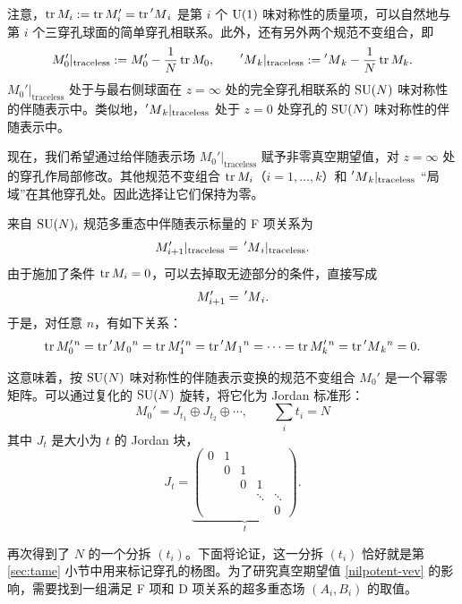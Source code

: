 注意，$\mathop{\mathrm{tr}}\nolimits M_i:=\mathop{\mathrm{tr}}\nolimits M_i'=\mathop{\mathrm{tr}}\nolimits\prescript{\prime}{}M_i$ 是第 $i$ 个 ${\mathrm{U}}(1)$ 味对称性的质量项，可以自然地与第 $i$ 个三穿孔球面的简单穿孔相联系。此外，还有另外两个规范不变组合，即
\begin{equation}
M_0'|_\text{traceless}:=M_0'-\frac1N\mathop{\mathrm{tr}}\nolimits M_0,\qquad
\prescript{\prime}{}M_k|_\text{traceless}:=\prescript{\prime}{}M_k-\frac1N\mathop{\mathrm{tr}}\nolimits M_k.
\end{equation}
$M_0'|_\text{traceless}$ 处于与最右侧球面在 $z=\infty$ 处的完全穿孔相联系的 $\mathop{\mathrm{SU}}(N)$ 味对称性的伴随表示中。类似地，$\prescript{\prime}{}M_k|_\text{traceless}$ 处于 $z=0$ 处穿孔的 $\mathop{\mathrm{SU}}(N)$ 味对称性的伴随表示中。

现在，我们希望通过给伴随表示场 $M_0'|_\text{traceless}$ 赋予非零真空期望值，对 $z=\infty$ 处的穿孔作局部修改。其他规范不变组合 $\mathop{\mathrm{tr}}\nolimits M_i$（$i=1,\ldots,k$）和 $\prescript{\prime}{}M_k|_\text{traceless}$ “局域”在其他穿孔处。因此选择让它们保持为零。

来自 $\mathop{\mathrm{SU}}(N)_i$ 规范多重态中伴随表示标量的 F 项关系为
\begin{equation}
M_{i+1}'|_\text{traceless}={}\prescript{\prime}{}M_i|_\text{traceless}.
\end{equation}
由于施加了条件 $\mathop{\mathrm{tr}}\nolimits M_i=0$，可以去掉取无迹部分的条件，直接写成
\begin{equation}
M_{i+1}'={}\prescript{\prime}{}M_i.
\end{equation}
于是，对任意 $n$，有如下关系：
\begin{equation}
\mathop{\mathrm{tr}}\nolimits M_0'{}^n=\mathop{\mathrm{tr}}\nolimits\prescript{\prime}{}M_0{}^n=\mathop{\mathrm{tr}}\nolimits M_1'{}^n=\mathop{\mathrm{tr}}\nolimits\prescript{\prime}{}M_1{}^n
=\cdots=\mathop{\mathrm{tr}}\nolimits M_k'{}^n=\mathop{\mathrm{tr}}\nolimits\prescript{\prime}{}M_k{}^n=0.
\end{equation}

这意味着，按 $\mathop{\mathrm{SU}}(N)$ 味对称性的伴随表示变换的规范不变组合 $M_0'$ 是一个幂零矩阵。可以通过复化的 $\mathop{\mathrm{SU}}(N)$ 旋转，将它化为 Jordan 标准形：
\begin{equation}
M_0'=J_{t_1}\oplus J_{t_2}\oplus\cdots,\qquad\sum_it_i=N\label{nilpotent-vev}
\end{equation}
其中 $J_t$ 是大小为 $t$ 的 Jordan 块，
\begin{equation}
J_t=\underbrace{\begin{pmatrix}
0&1\\
&0&1\\
&&0&1\\
&&&\ddots&\ddots\\
&&&&0
\end{pmatrix}}_t.
\end{equation}

再次得到了 $N$ 的一个分拆 $(t_i)$。下面将论证，这一分拆 $(t_i)$ 恰好就是第 \ref{sec:tame} 小节中用来标记穿孔的杨图。为了研究真空期望值 \eqref{nilpotent-vev} 的影响，需要找到一组满足 F 项和 D 项关系的超多重态场 $(A_i,B_i)$ 的取值。

